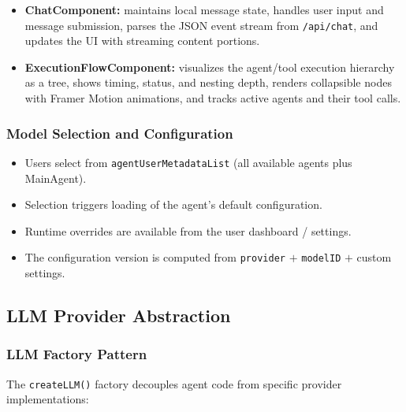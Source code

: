 \documentclass[11pt,a4paper]{report}
\newcommand{\code}[1]{\texttt{\small #1}}
\begin{document}
\begin{itemize}
  \item \textbf{ChatComponent:} maintains local message state, handles user input and message submission, parses the JSON event stream from \code{/api/chat}, and updates the UI with streaming content portions.
  \item \textbf{ExecutionFlowComponent:} visualizes the agent/tool execution hierarchy as a tree, shows timing, status, and nesting depth, renders collapsible nodes with Framer Motion animations, and tracks active agents and their tool calls.
\end{itemize}

\subsubsection{Model Selection and Configuration}

\begin{itemize}
  \item Users select from \code{agentUserMetadataList} (all available agents plus MainAgent).
  \item Selection triggers loading of the agent's default configuration.
  \item Runtime overrides are available from the user dashboard / settings.
  \item The configuration version is computed from \code{provider} $+$ \code{modelID} $+$ custom settings.
\end{itemize}

\subsection{LLM Provider Abstraction}

\subsubsection{LLM Factory Pattern}

The \code{createLLM()} factory decouples agent code from specific provider implementations:
\end{document}
